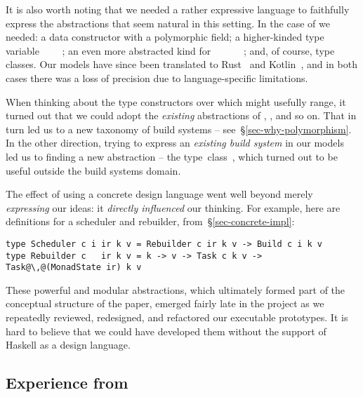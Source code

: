 It is also worth noting that we needed a rather expressive language
to faithfully express the abstractions that seem natural in this
setting.  In the case of  we needed: a data constructor with a
polymorphic field; a higher-kinded type variable ~\hs{::}~\hs{*}~\hs{->}~\hs{*}; an
even more abstracted kind for ~\hs{::}~\hs{(*}~\hs{->}~\hs{*)}~\hs{->}~; and,
of course, type classes. Our models have since been translated to
Rust~\cite{translation_rust} and Kotlin~\cite{translation_kotlin}, and in both
cases there was a loss of precision due to language-specific limitations.

When thinking about the type constructors over which  might usefully
range, it turned out that we could adopt the \emph{existing} abstractions
of , ,  and so on.
That in turn led us to a new taxonomy
of build systems -- see~\S\ref{sec-why-polymorphism}. In the other direction,
trying to express an \emph{existing build system} \Dune in our models led us to
finding a new abstraction -- the  \mbox{type
class~\cite{mokhov_selective_2019}}, which turned out to be useful outside the
build systems domain.

The effect of using a concrete design language went well beyond
merely \emph{expressing} our ideas: it \emph{directly influenced}
our thinking.  For example, here are definitions for a scheduler and rebuilder,
from~\S\ref{sec-concrete-impl}:

\vspace{0.5mm}
\begin{verbatim}
type Scheduler c i ir k v = Rebuilder c ir k v -> Build c i k v
type Rebuilder c   ir k v = k -> v -> Task c k v -> Task@\,@(MonadState ir) k v
\end{verbatim}
\vspace{0.5mm}

These powerful and modular abstractions, which ultimately formed part
of the conceptual structure of the paper, emerged fairly late in the
project as we repeatedly reviewed, redesigned, and refactored our
executable prototypes. It is hard to believe that we could have
developed them without the support of Haskell as a design language.

\subsection{Experience from \Shake}\label{sec-experience-shake}

